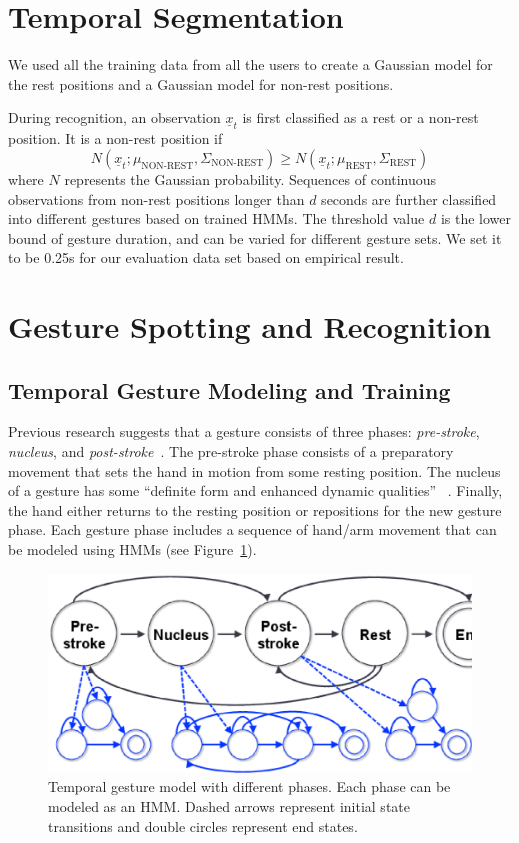 \documentclass{sig-alternate-2013}
\begin{document}
\section{Temporal Segmentation}\label{sec:recognition}
We used all the training data from all the users to create a Gaussian model for the rest 
positions and a Gaussian model for non-rest positions.

During recognition, an observation $\underline{x}_t$ is first classified as a 
rest or a non-rest position. It is a non-rest position if 
\begin{displaymath}
N(\underline{x}_t; \mu_{\text{NON-REST}}, \Sigma_{\text{NON-REST}}) \geq N(\underline{x}_t; \mu_{\text{REST}}, \Sigma_{\text{REST}})
\end{displaymath}
where $N$ represents the Gaussian probability. Sequences of continuous observations from non-rest
positions longer than $d$ seconds are further classified into different
gestures based on trained HMMs. The threshold value $d$ is the lower bound of
gesture duration, and can be varied for different gesture sets. We set it to
be 0.25s for our evaluation data set based on empirical result.
 
\section{Gesture Spotting and Recognition}
\subsection{Temporal Gesture Modeling and Training}
Previous research suggests that
a gesture consists of three phases: \textit{pre-stroke}, \textit{nucleus}, and \textit{post-stroke}~\cite{Pavlovic97}. The pre-stroke phase consists
of a preparatory movement that sets the hand in motion from some resting position.
The nucleus of a gesture has some ``definite form and enhanced dynamic qualities''
~\cite{kendon86}. Finally, the hand either returns to the resting position or repositions
for the new gesture phase. Each gesture
phase includes a sequence of hand/arm movement that can be modeled using HMMs (see Figure~\ref{fig:hmm}). 

\begin{figure}[tb]
\centering
\includegraphics[clip, width=1\columnwidth]{fig/hmm.ps}
\caption{Temporal gesture model with different phases. Each phase can be modeled as an HMM. Dashed arrows represent
initial state transitions and double circles
represent end states.}
\label{fig:hmm}
\end{figure}
\end{document}
